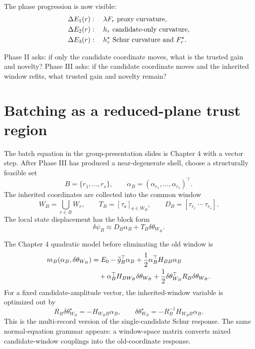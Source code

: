 \documentclass[10pt,twocolumn]{article}
\begin{document}
The phase progression is now visible:
\begin{align}
\Delta E_1(r)
&:\quad \lambda F_r\text{ proxy curvature},\notag\\
\Delta E_2(r)
&:\quad h_r\text{ candidate-only curvature},\notag\\
\Delta E_3(r)
&:\quad h_r^\star\text{ Schur curvature and }F_r^\star.
\label{eq:phase_progression}
\end{align}

\begin{paperbox}
Phase II asks: if only the candidate coordinate moves, what is the trusted gain and novelty? Phase III asks: if the candidate coordinate moves and the inherited window refits, what trusted gain and novelty remain?
\end{paperbox}

\section{Batching as a reduced-plane trust region}

The batch equation in the group-presentation slides is Chapter 4 with a vector
step.  After Phase III has produced a near-degenerate shell, choose a
structurally feasible set
\[
B=\{r_1,\ldots,r_s\},
\qquad
\alpha_B=(\alpha_{r_1},\ldots,\alpha_{r_s})^\top .
\]
The inherited coordinates are collected into the common window
\[
W_B=\bigcup_{r\in B}W_r,
\qquad
T_B=[\tau_a]_{a\in W_B},
\qquad
D_B=[\tau_{r_1}\ \cdots\ \tau_{r_s}].
\]
The local state displacement has the block form
\begin{equation}
\delta\psi_B
\approx
D_B\alpha_B+T_B\delta\theta_{W_B}.
\label{eq:nocedal_batch_step_before_refit}
\end{equation}

The Chapter 4 quadratic model before eliminating the old window is
\begin{align}
m_B(\alpha_B,\delta\theta_{W_B})
&=E_0-\widetilde g_B^\top\alpha_B
+\frac12\alpha_B^\top H_{BB}\alpha_B
\notag\\
&\quad
+\alpha_B^\top H_{BW_B}\delta\theta_{W_B}
+\frac12\delta\theta_{W_B}^\top R_B\delta\theta_{W_B}.
\label{eq:nocedal_batch_block_model}
\end{align}
For a fixed candidate-amplitude vector, the inherited-window variable is
optimized out by
\begin{equation}
R_B\delta\theta_{W_B}^\star
=-H_{W_BB}\alpha_B,
\qquad
\delta\theta_{W_B}^\star
=-R_B^{-1}H_{W_BB}\alpha_B.
\label{eq:nocedal_batch_window_solve}
\end{equation}
This is the multi-record version of the single-candidate Schur response.  The
same normal-equation grammar appears: a window-space matrix converts mixed
candidate-window couplings into the old-coordinate response.
\end{document}

